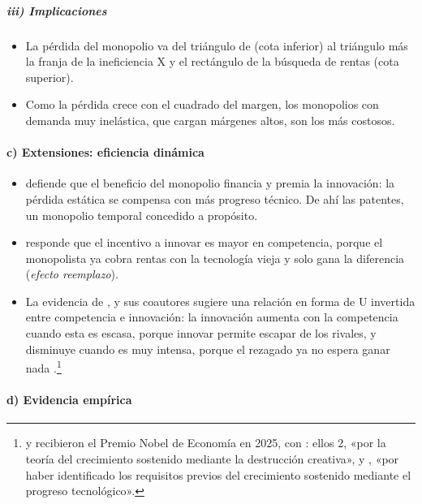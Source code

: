 \documentclass[11pt]{article}
\begin{document}
\subparagraph{iii) Implicaciones}

\begin{itemize}
\item La pérdida del monopolio va del triángulo de  (cota inferior) al triángulo más la franja de la ineficiencia X y el rectángulo de la búsqueda de rentas (cota superior).
\item Como la pérdida crece con el cuadrado del margen, los monopolios con demanda muy inelástica, que cargan márgenes altos, son los más costosos.
\end{itemize}

\paragraph{c) Extensiones: eficiencia dinámica}

\begin{itemize}
\item \textcite{Schumpeter1942Capitalism} defiende que el beneficio del monopolio financia y premia la innovación: la pérdida estática se compensa con más progreso técnico. De ahí las patentes, un monopolio temporal concedido a propósito.
\item \textcite{Arrow1962Economic} responde que el incentivo a innovar es mayor en competencia, porque el monopolista ya cobra rentas con la tecnología vieja y solo gana la diferencia (\emph{efecto reemplazo}).
\item La evidencia de ,  y sus coautores sugiere una relación en forma de U invertida entre competencia e innovación: la innovación aumenta con la competencia cuando esta es escasa, porque innovar permite escapar de los rivales, y disminuye cuando es muy intensa, porque el rezagado ya no espera ganar nada\nocite{AghionEtAl2005Competition} .\footnote{ y  recibieron el Premio Nobel de Economía en 2025, con : ellos 2, «por la teoría del crecimiento sostenido mediante la destrucción creativa», y , «por haber identificado los requisitos previos del crecimiento sostenido mediante el progreso tecnológico»\nocite{NobelPrize2025}.}
\end{itemize}

\paragraph{d) Evidencia empírica}
\end{document}
